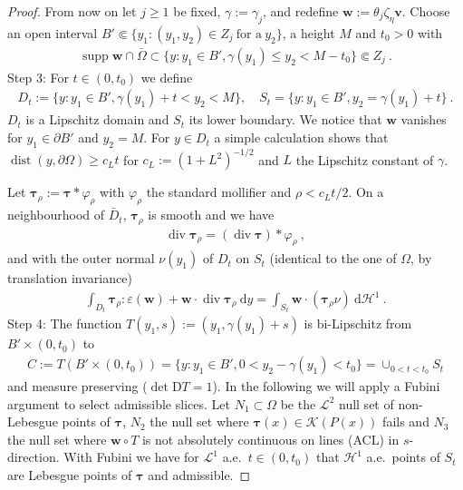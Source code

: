 \documentclass{article}
\theoremstyle{definition}
\newcommand{\bfv}{\boldsymbol{v}}
\newcommand{\bfw}{\boldsymbol{w}}
\newcommand{\bftau}{\boldsymbol{\tau}}
\newcommand{\K}{\mathcal{K}}
\newcommand{\dd}{\:\mathrm{d}}
\renewcommand\div{\operatorname{\mathrm{div}}}
\DeclareMathOperator{\dist}{dist}
\DeclareMathOperator{\supp}{supp}
\begin{document}
\begin{proof}
    From now on let $j\geq 1$ be fixed, $\gamma:= \gamma_j$, and redefine $\bfw:= \theta_j\zeta_\eta\bfv$. Choose an open interval $B' \Subset \{y_1:(y_1,y_2)\in Z_j\ \text{for a}\ y_2\}$, a height $M$ and $t_0>0$ with
    \begin{align*}
        \supp \bfw \cap \bar\Omega \subset \{y : y_1\in B', \gamma(y_1)\leq y_2 < M-t_0\} \Subset Z_j \ .
    \end{align*}
    Step 3: For $t \in (0,t_0)$ we define
    \begin{align*}
        D_t := \{y : y_1\in B', \gamma(y_1)+t <y_2<M\}, \quad S_t =\{y : y_1\in B', y_2 = \gamma(y_1)+t\} \ .
    \end{align*}
    $D_t$ is a Lipschitz domain and $S_t$ its lower boundary. We notice that $\bfw$ vanishes for $y_1\in\partial B'$ and $y_2=M$. For $y\in D_t$ a simple calculation shows that $\dist(y,\partial\Omega)\geq c_L t$ for $c_L := (1+L^2)^{-1/2}$ and
    $L$ the Lipschitz constant of $\gamma$.

    Let $\bftau_\rho := \bftau * \varphi_\rho$ with $\varphi_\rho$ the standard mollifier and $\rho < c_L t/2$. On a neighbourhood of $\bar D_t$, $\bftau_\rho$ is
    smooth and we have
     \begin{align*}
        \div \bftau_\rho = (\div\bftau) * \varphi_\rho \ ,
     \end{align*}
     and with the outer normal $\nu(y_1)$ of $D_t$ on $S_t$ (identical to the one of $\Omega$, by
     translation invariance)
     \begin{align}
        \int_{D_t} \bftau_\rho : \varepsilon(\bfw) + \bfw \cdot \div\bftau_\rho \dd y =
        \int_{S_t} \bfw \cdot(\bftau_\rho \nu) \dd \mathcal{H}^1 \ . \label{eq:trans}
     \end{align}
     Step 4:
     The function $T(y_1, s):= (y_1, \gamma(y_1)+s)$ is bi-Lipschitz from $B'\times (0,t_0)$ to
     \begin{align*}
        C := T(B'\times (0,t_0)) = \{y : y_1\in B', 0<y_2-\gamma(y_1)<t_0\} = \cup_{0<t<t_0} S_t
     \end{align*}
     and measure preserving ($\det \mathrm{D}T=1$). In the following we will apply
     a Fubini argument to select admissible slices.
     Let $N_1 \subset \Omega$ be the $\mathcal{L}^2$ null set of non-Lebesgue points of $\bftau$,
     $N_2$ the null set where $\bftau(x)\in \K(P(x))$ fails and $N_3$ the null set where $\bfw \circ T$ is not absolutely continuous on lines (ACL) in $s$-direction. With Fubini we have for $\mathcal{L}^1$ a.e.\ $t\in(0,t_0)$ that $\mathcal{H}^1$ a.e.\ points of $S_t$ are Lebesgue points of $\bftau$ and admissible.


\end{proof}
\end{document}
